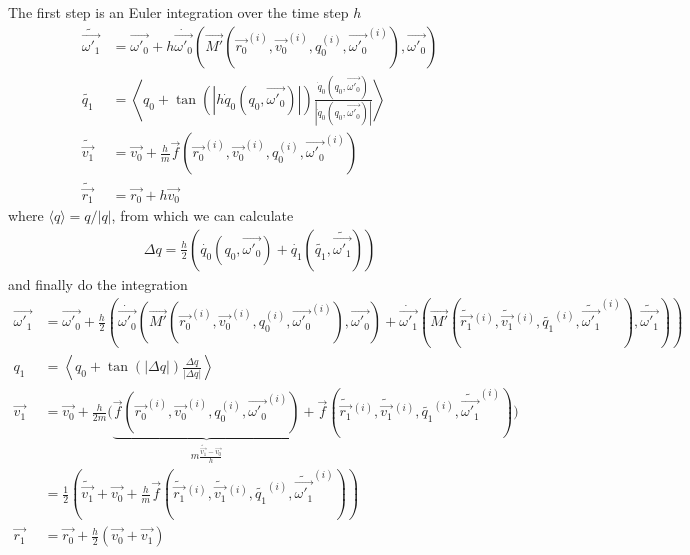 \documentclass[class=report, float=false, crop=false]{standalone}
\begin{document}
The first step is an Euler integration over the time step $h$
\begin{align*}
\tilde{\vec{\omega'_1}} &= \vec{\omega'_0} + h\dot{\vec{\omega'_0}}(\vec{M'}(\vec{r_0}^{(i)},\vec{v_0}^{(i)},q_0^{(i)},\vec{\omega'_0}^{(i)}),\vec{\omega'_0})\\
\tilde{q_1} &= \left\langle q_0 + \tan\left(|h\dot{q}_0(q_0,\vec{\omega'_0})|\right) \frac{\dot{q}_0(q_0,\vec{\omega'_0})}{|\dot{q}_0(q_0,\vec{\omega'_0})|}\right\rangle\\
\tilde{\vec{v_1}} &= \vec{v_0} + \frac{h}{m} \vec{f}(\vec{r_0}^{(i)},\vec{v_0}^{(i)},q_0^{(i)},\vec{\omega'_0}^{(i)})\\
\tilde{\vec{r_1}} &= \vec{r_0} + h\vec{v_0}
\end{align*}
where $\langle q \rangle = q/|q|$, from which we can calculate
\begin{align*}
\Delta q = \frac{h}{2} \left( \dot{q_0}(q_0,\vec{\omega'_0}) + \dot{q_1}(\tilde{q_1},\tilde{\vec{\omega'_1}}) \right)
\end{align*}
and finally do the integration
\begin{align*}
\vec{\omega'_1} &= \vec{\omega'_0} + \frac{h}{2}\left(\dot{\vec{\omega'_0}}(\vec{M'}(\vec{r_0}^{(i)},\vec{v_0}^{(i)},q_0^{(i)},\vec{\omega'_0}^{(i)}),\vec{\omega'_0}) + \dot{\vec{\omega'_1}}(\vec{M'}(\tilde{\vec{r_1}}\hspace{1pt}^{(i)},\tilde{\vec{v_1}}\hspace{1pt}^{(i)},\tilde{q_1}^{(i)},\tilde{\vec{\omega'_1}}^{(i)}),\tilde{\vec{\omega'_1}}) \right)\\
q_1 &= \left\langle q_0 + \tan\left(|\Delta q|\right) \frac{\Delta q}{|\Delta q|} \right \rangle\\
\vec{v_1} &= \vec{v_0} + \frac{h}{2m} \Big( \underbrace{\vec{f}(\vec{r_0}^{(i)},\vec{v_0}^{(i)},q_0^{(i)},\vec{\omega'_0}^{(i)})}_{\textstyle m\frac{\tilde{\vec{v_1}} - \vec{v_0}}{h}} + \vec{f}(\tilde{\vec{r_1}}\hspace{1pt}^{(i)},\tilde{\vec{v_1}}\hspace{1pt}^{(i)},\tilde{q_1}^{(i)},\tilde{\vec{\omega'_1}}^{(i)}) \Big)\\
&= \frac{1}{2} \left(\tilde{\vec{v_1}} + \vec{v_0} + \frac{h}{m} \vec{f}(\tilde{\vec{r_1}}\hspace{1pt}^{(i)},\tilde{\vec{v_1}}\hspace{1pt}^{(i)},\tilde{q_1}^{(i)},\tilde{\vec{\omega'_1}}^{(i)}) \right)\\
\vec{r_1} &= \vec{r_0} + \frac{h}{2}\left(\vec{v_0} + \vec{v_1}\right)
\end{align*}

% 
\end{document}
